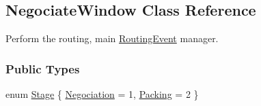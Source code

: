 \hypertarget{classKite_1_1NegociateWindow}{}\subsection{Negociate\+Window Class Reference}
\label{classKite_1_1NegociateWindow}


Perform the routing, main \mbox{\hyperlink{classKite_1_1RoutingEvent}{Routing\+Event}} manager.  


\subsubsection*{Public Types}
\begin{DoxyCompactItemize}
\item 
enum \mbox{\hyperlink{classKite_1_1NegociateWindow_aca8133200c1122e29b87b314d82604eb}{Stage}} \{ \newline
\mbox{\hyperlink{classKite_1_1NegociateWindow_aca8133200c1122e29b87b314d82604eba19ccda3133337a5db697480ebfd6097f}{Negociation}} = 1, 
\newline
\mbox{\hyperlink{classKite_1_1NegociateWindow_aca8133200c1122e29b87b314d82604ebabdd3263d9492edf336ac52b4a9776b82}{Packing}} = 2
 \}
\end{DoxyCompactItemize}
